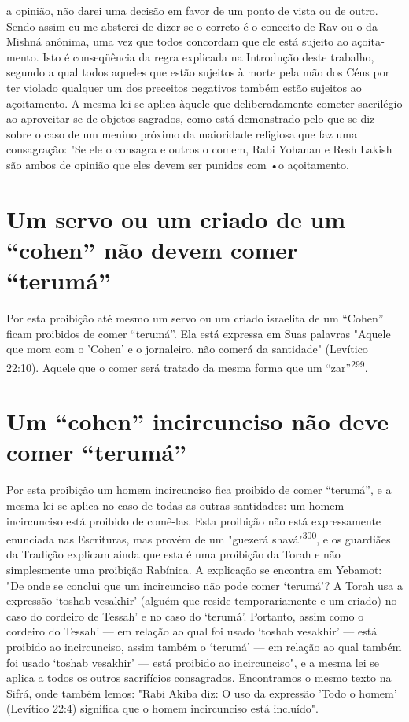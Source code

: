 a opinião, não darei uma decisão em favor de um ponto de vista ou de
outro. Sendo assim eu me absterei de dizer se o correto é o conceito de
Rav ou o da Mishná anônima, uma vez que todos concordam que ele está
sujeito ao açoita­mento. Isto é conseqüência da regra explicada na
Introdução deste trabalho, segundo a qual todos aqueles que estão
sujeitos à morte pela mão dos Céus por ter violado qualquer um dos
preceitos negativos também estão sujeitos ao açoitamento. A mesma lei se
aplica àquele que deliberadamente cometer sacri­légio ao aproveitar-se
de objetos sagrados, como está demonstrado pelo que se diz sobre o caso
de um menino próximo da maioridade religiosa que faz uma consagração:
"Se ele o consagra e outros o comem, Rabi Yohanan e Resh La­kish são
ambos de opinião que eles devem ser punidos com •o açoitamento.

\section{Um servo ou um criado de um ``cohen'' não devem comer ``terumá''}

Por esta proibição até mesmo um servo ou um criado israelita de um
``Cohen'' ficam proibidos de comer ``terumá''. Ela está expressa em Suas
pala­vras "Aquele que mora com o 'Cohen' e o jornaleiro, não comerá da
santida­de" (Levítico 22:10). Aquele que o comer será tratado da mesma
forma que um ``zar''\textsuperscript{299}.

\section{Um ``cohen'' incircunciso não deve comer ``terumá''}

Por esta proibição um homem incircunciso fica proibido de comer
``terumá'', e a mesma lei se aplica no caso de todas as outras santidades:
um homem incircunciso está proibido de comê-las. Esta proibição não está
expres­samente enunciada nas Escrituras, mas provém de um "guezerá
shavá"\textsuperscript{300}, e os guardiães da Tradição explicam ainda
que esta é uma proibição da Torah e não simplesmente uma proibição
Rabínica. A explicação se encontra em Ye­bamot: "De onde se conclui que
um incircunciso não pode comer `terumá'? A Torah usa a expressão `toshab
vesakhir' (alguém que reside temporariamente e um criado) no caso do
cordeiro de Tessah' e no caso do `terumá'. Portanto, assim como o
cordeiro do Tessah' --- em relação ao qual foi usado `toshab ve­sakhir'
--- está proibido ao incircunciso, assim também o `terumá' --- em
rela­ção ao qual também foi usado `toshab vesakhir' --- está proibido ao
incircunci­so", e a mesma lei se aplica a todos os outros sacrifícios
consagrados. Encon­tramos o mesmo texto na Sifrá, onde também lemos:
"Rabi Akiba diz: O uso da expressão 'Todo o homem' (Levítico 22:4)
significa que o homem incircun­ciso está incluído".

